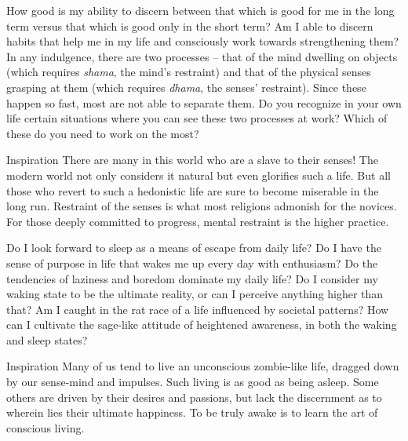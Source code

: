 \newpage
\begin{mananam}{}
\mananamtext How good is my ability to discern between that which is good for me in the long term versus that which is good only in the short term? Am I able to discern habits that help me in my life and consciously work towards strengthening them?
In any indulgence, there are two processes – that of the mind dwelling on objects (which requires \emph{shama}, the mind’s restraint) and that of the physical senses grasping at them (which requires \emph{dhama}, the senses’ restraint). Since these happen so fast, most are not able to separate them. Do you recognize in your own life certain situations where you can see these two processes at work? Which of these do you need to work on the most?
\end{mananam}
\WritingHand{}
\begin{inspiration}{\mananamfont Inspiration}
\mananamtext There are many in this world who are a slave to their senses! The modern world not only considers it natural but even glorifies such a life. But all those who revert to such a hedonistic life are sure to become miserable in the long run. Restraint of the senses is what most religions admonish for the novices. For those deeply committed to progress, mental restraint is the higher practice.
\end{inspiration}
\newpage


\newpage
\begin{mananam}{}
\mananamtext Do I look forward to sleep as a means of escape from daily life? Do I have the sense of purpose in life that wakes me up every day with enthusiasm? Do the tendencies of laziness and boredom dominate my daily life?
Do I consider my waking state to be the ultimate reality, or can I perceive anything higher than that? Am I caught in the rat race of a life influenced by societal patterns? How can I cultivate the sage-like attitude of heightened awareness, in both the waking and sleep states?
\end{mananam}
\WritingHand{}
\begin{inspiration}{\mananamfont Inspiration}
\mananamtext Many of us tend to live an unconscious zombie-like life, dragged down by our sense-mind and impulses. Such living is as good as being asleep. Some others are driven by their desires and passions, but lack the discernment as to wherein lies their ultimate happiness. To be truly awake is to learn the art of conscious living.
\end{inspiration}
\newpage

